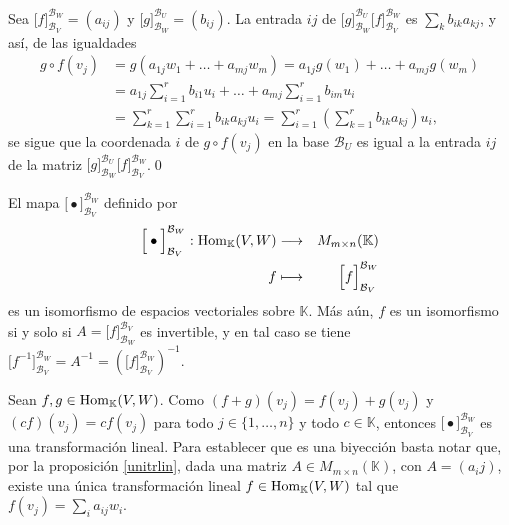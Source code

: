 \dem Sea $\Big[ f \Big]^{\mathcal{B}_W}_{\mathcal{B}_V}=(a_{ij})$ y $\Big[ g \Big]^{\mathcal{B}_U}_{\mathcal{B}_W}=(b_{ij})$.
La entrada $ij$ de $\Big[ g \Big]^{\mathcal{B}_U}_{\mathcal{B}_W}\Big[ f \Big]^{\mathcal{B}_W}_{\mathcal{B}_V}$ es $\sum_k b_{ik}a_{kj}$, y as\'i, de las igualdades
\begin{align*}
g\circ f(v_j) &= g(a_{1j}w_1+\ldots+a_{mj}w_m)=a_{1j}g(w_1)+\ldots+a_{mj}g(w_m)\\
 & = a_{1j}\sum_{i=1}^rb_{i1}u_i+\ldots+a_{mj}\sum_{i=1}^rb_{im}u_i\\
 & = \sum_{k=1}^r\sum_{i=1}^rb_{ik}a_{kj}u_i=\sum_{i=1}^r\left(\sum_{k=1}^r b_{ik}a_{kj}\right)u_i,
\end{align*}
se sigue que la coordenada $i$ de $g\circ f(v_j)$ en la base $\mathcal{B}_U$ es igual a la entrada $ij$ de la matriz $\Big[ g \Big]^{\mathcal{B}_U}_{\mathcal{B}_W}\Big[ f \Big]^{\mathcal{B}_W}_{\mathcal{B}_V}$.\qed

\begin{prop}\label{homym}
El mapa $\Big[ \bullet \Big]^{\mathcal{B}_W}_{\mathcal{B}_V}$ definido por
\begin{eqnarray*}
\Big[ \bullet \Big]^{\mathcal{B}_W}_{\mathcal{B}_V}: \operatorname{Hom}_{\mathbb{K}}(V,W) & \longrightarrow & M_{m\times n}(\mathbb{K})\\
f & \longmapsto & \Big[ f \Big]^{\mathcal{B}_W}_{\mathcal{B}_V}
\end{eqnarray*}
es un isomorfismo de espacios vectoriales sobre $\mathbb{K}$. M\'as a\'un, $f$ es un isomorfismo si y solo si $A=\Big[ f \Big]_{\mathcal{B}_W}^{\mathcal{B}_V}$ es invertible, y en tal caso se tiene $\Big[ f^{-1} \Big]^{\mathcal{B}_W}_{\mathcal{B}_V}=A^{-1}=\left(\Big[ f \Big]_{\mathcal{B}_V}^{\mathcal{B}_W}\right)^{-1}$.
\end{prop}

\dem Sean $f,g\in\operatorname{Hom}_{\mathbb{K}}(V,W)$. Como $(f+g)(v_j)=f(v_j)+g(v_j)$ y $(cf)(v_j)=cf(v_j)$ para todo $j\in\{1,\ldots,n\}$ y todo $c\in \mathbb{K}$, entonces  $\Big[ \bullet \Big]^{\mathcal{B}_W}_{\mathcal{B}_V}$ es una transformaci\'on lineal. Para establecer que es una biyecci\'on basta notar que, por la proposici\'on \ref{unitrlin}, dada una matriz $A\in M_{m\times n}(\mathbb{K})$, con $A=(a_ij)$, existe una \'unica transformaci\'on lineal $f\in \operatorname{Hom}_{\mathbb{K}}(V,W)$ tal que $f(v_j)=\sum_i a_{ij}w_i$.

